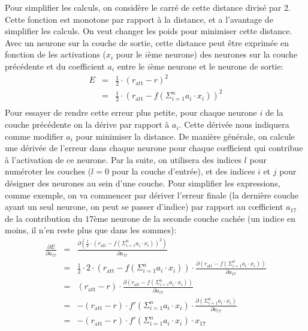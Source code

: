 \documentclass[a4paper]{article}
\def\ffrac#1#2{\frac{\displaystyle #1}{\displaystyle #2}}
\begin{document}
Pour simplifier les calculs, on considère le carré de cette distance
divisé par 2. Cette fonction est monotone par rapport à la distance,
et a l'avantage de simplifier les calculs. On veut changer les poids
pour minimiser cette distance. Avec un neurone sur la couche de
sortie, cette distance peut être exprimée en fonction de les activations
(\(x_i\) pour le \(i\)ème neurone) des neurones sur la couche
précédente et du coefficient \(a_i\) entre le \(i\)ème neurone et le
neurone de sortie:
\[
  \begin{array}{rcl}
E & = & \frac 12\cdot ( r_{\text{att}} - r)^2\\
  & = & \frac 12 \cdot ( r_{\text{att}} - f( \Sigma_{i=1}^n a_i\cdot x_i))^2\\
  \end{array}
\]
Pour essayer de rendre cette erreur plus petite, pour chaque neurone
\(i\) de la couche précédente on la dérive par rapport à
\(a_i\). Cette dérivée nous indiquera comme modifier \(a_i\) pour
minimiser la distance. De manière générale, on calcule une dérivée de
l'erreur dans chaque neurone pour chaque c\oe fficient qui contribue à
l'activation de ce neurone. Par la suite, on utilisera des indices
\(l\) pour numéroter les couches (\(l=0\) pour la couche d'entrée), et
des indices \(i\) et \(j\) pour désigner des neurones au sein d'une
couche. Pour simplifier les expressions, comme exemple, on va
commencer par dériver l'erreur finale (la dernière couche ayant un
seul neurone, on peut se passer d'indice) par rapport au c\oe fficient
\(a_{17}\) de la contribution du \(17\)ème neurone de la seconde
couche cachée (un indice en moins, il n'en reste plus que dans les
sommes):
\[
  \begin{array}{rcl}
\ffrac{\partial E}{\partial a_{17}} & = & \ffrac{\partial ( \ffrac 12 \cdot ( r_{\text{att}} - f( \Sigma_{i=1}^n a_i\cdot x_i))^2 )}{\partial a_{17}}\\
    &=& \ffrac 12 \cdot 2 \cdot ( r_{\text{att}} - f( \Sigma_{i=1}^n a_i\cdot x_i))\cdot \ffrac{\partial ( r_{\text{att}} - f( \Sigma_{i=1}^n a_i\cdot x_i) )}{\partial a_{17}}\\
    &=& ( r_{\text{att}} - r )\cdot \ffrac{\partial ( r_{\text{att}} - f( \Sigma_{i=1}^n a_i\cdot x_i) )}{\partial a_{17}}\\
    &=& - ( r_{\text{att}} - r)\cdot  f' ( \Sigma_{i=1}^n a_i\cdot x_i) \cdot \ffrac{\partial (\Sigma_{i=1}^n a_i\cdot x_i)}{\partial a_{17}}\\
    &=& - ( r_{\text{att}} - r )\cdot  f' ( \Sigma_{i=1}^n a_i\cdot x_i) \cdot x_{17}\\
  \end{array}
\]
\end{document}
